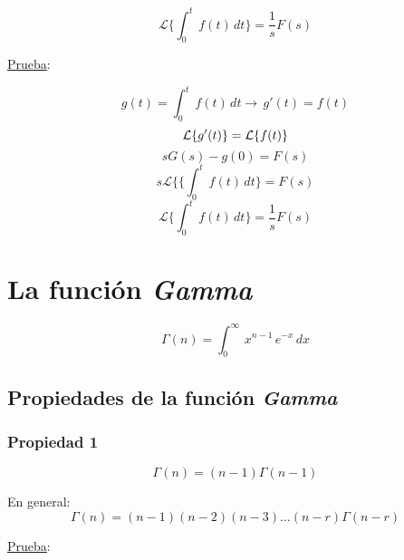 \begin{equation}
    \mathcal{L}\biggl\{\int_0^t\,f(t)\,dt\biggl\}=\frac{1}{s}F(s)
\end{equation}

\underline{Prueba}:

\begin{equation*}
    g(t)=\int_0^t\,f(t)\,dt\rightarrow\,g'(t)=f(t)
\end{equation*}
\begin{equation*}
    \mathcal{L}\{g'(t)\}=\mathcal{L}\{f(t)\}\\
\end{equation*}
\begin{equation*}
    sG(s)-g(0)=F(s)
\end{equation*}
\begin{equation*}
    s\mathcal{L}\{\biggl\{\int_0^t\,f(t)\,dt\biggl\}=F(s)
\end{equation*}
\begin{equation*}
    \mathcal{L}\biggl\{\int_0^t\,f(t)\,dt\biggl\}=\frac{1}{s}F(s)
\end{equation*}

\section{La función \emph{Gamma}}
\begin{equation}
    \Gamma(n)=\int_0^{\infty}\,x^{n-1}\,e^{-x}\,dx
\end{equation}

\subsection{Propiedades de la función \emph{Gamma}}

\subsubsection*{Propiedad 1}
\begin{equation}
    \Gamma(n)=(n-1)\Gamma(n-1)
\end{equation}

En general:
\begin{equation}
    \Gamma(n)=(n-1)(n-2)(n-3)\dots(n-r)\Gamma(n-r)
\end{equation}

\underline{Prueba}:

